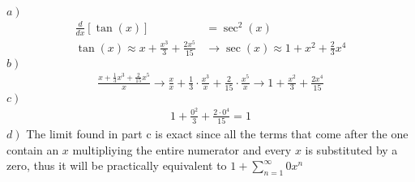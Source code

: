 \documentclass{article}
\begin{document}
\section{}
	$\left.a\right)$ 
	\begin{align*}
		\frac{d}{dx}\left[\tan (x)\right]&=\sec^{2}(x)\\
		\tan (x)\approx x+\frac{x^3}{3}+\frac{2x^5}{15} &\rightarrow \sec (x)\approx 1+x^2+\frac{2}{3}x^4
	\end{align*}
	$\left.b\right)$
	\begin{align*}
		\frac{x+\frac{1}{3}x^3+\frac{2}{15}x^5}{x} \rightarrow \frac{x}{x}+\frac{1}{3}\cdot\frac{x^3}{x}+\frac{2}{15}\cdot\frac{x^5}{x} \rightarrow 1+\frac{x^2}{3}+\frac{2x^4}{15}
	\end{align*}
	$\left.c\right)$
	\begin{align*}
		1+\frac{0^2}{3}+\frac{2\cdot 0^4}{15} = 1
	\end{align*}
	$\left.d\right)$
	The limit found in part c is exact since all the terms that come after the one contain an $x$ multipliying the entire numerator and every $x$ is substituted by a zero, thus it will be practically equivalent to $1+\sum\limits_{n=1}^{\infty}{0x^n}$
	
\end{document}
